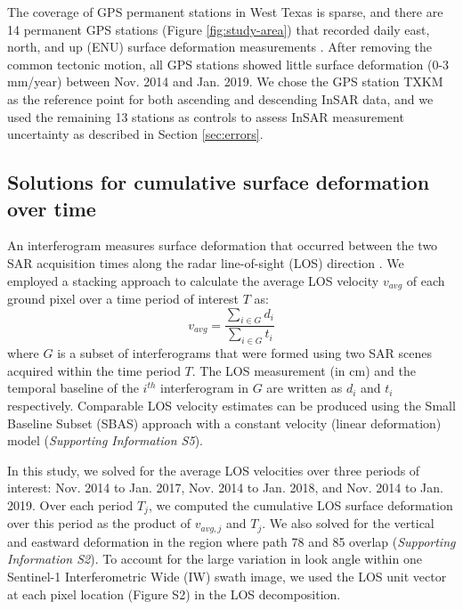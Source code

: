 \documentclass[draft]{agujournal2019}
\begin{document}
The coverage of GPS permanent stations in West Texas is sparse, and there are 14 permanent GPS stations (Figure \ref{fig:study-area}) that recorded daily east, north, and up (ENU) surface deformation measurements \cite{Blewitt2018}. After removing the common tectonic motion, all GPS stations showed little surface deformation (0-3 mm/year) between Nov. 2014 and Jan. 2019. We chose the GPS station TXKM as the reference point for both ascending and descending InSAR data, and we used the remaining 13 stations as controls to assess InSAR measurement uncertainty as described in Section \ref{sec:errors}.

\subsection{Solutions for cumulative surface deformation over time}
\label{sec:stacking}
An interferogram measures surface deformation that occurred between the two SAR acquisition times along the radar line-of-sight (LOS) direction \cite{Hanssen2001}. We employed a stacking approach \cite{Sandwell1998} to calculate the average LOS velocity $v_{avg}$ of each ground pixel over a time period of interest $T$ as:
\begin{equation}
v_{avg} = \frac{\sum_{i \in G} d_i}{\sum_{i \in G} t_i}
\label{eq:stacking}
\end{equation}
where $G$ is a subset of interferograms that were formed using two SAR scenes acquired within the time period $T$. The LOS measurement (in cm) and the temporal baseline of the $i^{th}$ interferogram in $G$ are written as $d_i$ and $ t_i $ respectively. Comparable LOS velocity estimates can be produced using the Small Baseline Subset (SBAS) approach \cite{SBAS2002} with a constant velocity (linear deformation) model (\textit{Supporting Information S5}).

In this study, we solved for the average LOS velocities over three periods of interest: Nov. 2014 to Jan. 2017, Nov. 2014 to Jan. 2018, and Nov. 2014 to Jan. 2019. Over each period $T_j$, we computed the cumulative LOS surface deformation over this period as the product of $v_{avg,j}$ and $T_j$. We also solved for the vertical and eastward deformation in the region where path 78 and 85 overlap (\textit{Supporting Information S2}). To account for the large variation in look angle within one Sentinel-1 Interferometric Wide (IW) swath image, we used the LOS unit vector at each pixel location (Figure S2) in the LOS decomposition.
\end{document}
